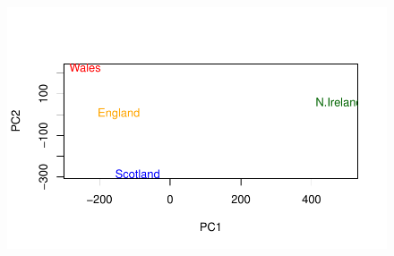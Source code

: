 \documentclass[
  letterpaper,
  DIV=11,
  numbers=noendperiod]{scrartcl}
\begin{document}
\begin{figure}[H]

{\centering \includegraphics{Lab-7_files/figure-pdf/unnamed-chunk-23-1.pdf}

}

\end{figure}
\end{document}
